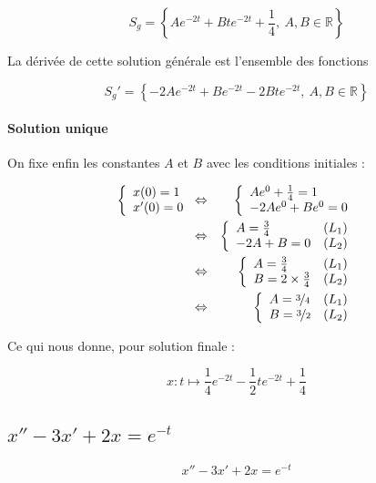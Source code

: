 \documentclass[a4paper, 11pt]{report} %
\newcommand{\R}{\mathbb{R}}
\renewcommand{\mapsto}{\longmapsto}
\begin{document}
\[
S_g = \left\{Ae^{-2t} + Bte^{-2t} + \frac{1}{4},~A,B\in\R\right\}
\]

La dérivée de cette solution générale est l'ensemble des fonctions

\[
S_g' = \left\{-2Ae^{-2t} + Be^{-2t} - 2Bte^{-2t},~A,B\in\R\right\}
\]

\paragraph{Solution unique}
On fixe enfin les constantes $A$ et $B$ avec les conditions initiales :

\begin{eqnarray*}
\left\{\begin{array}{l}
x(0) = 1\\
x'(0) = 0
\end{array}\right. & \Leftrightarrow &
\left\{\begin{array}{l}
Ae^0 + \frac{1}{4} = 1\\
-2Ae^0 + Be^0 = 0
\end{array}\right.\\
& \Leftrightarrow &                     %
\left\{\begin{array}{ll}
A = \frac{3}{4} & (L_1)\\
-2A + B = 0 & (L_2)
\end{array}\right.\\
& \Leftrightarrow &                     %
\left\{\begin{array}{ll}
A = \frac{3}{4} & (L_1)\\
B = 2\times\frac{3}{4} & (L_2)
\end{array}\right.\\
& \Leftrightarrow &                     %
\left\{\begin{array}{ll}
A = \nicefrac{3}{4} & (L_1)\\
B = \nicefrac{3}{2} & (L_2)
\end{array}\right.\\
\end{eqnarray*}

Ce qui nous donne, pour solution finale :

\[
x : t \mapsto \frac{1}{4}e^{-2t} - \frac{1}{2}te^{-2t} + \frac{1}{4}
\]
\subsection{$x'' -3x' + 2x = e^{-t}$} %

\begin{equation}
x'' -3x' + 2x = e^{-t}
\label{equa_diff_4}
\end{equation}
\end{document}
